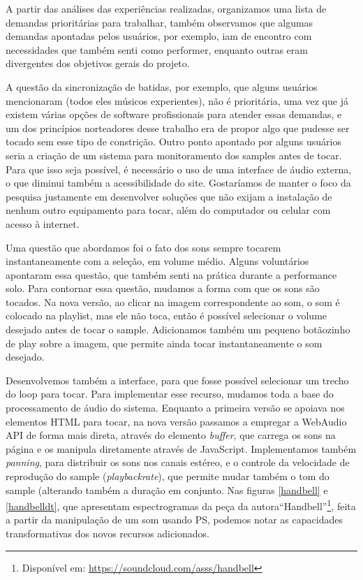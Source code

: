  A partir das análises das experiências realizadas, organizamos uma lista de demandas prioritárias para trabalhar, também observamos que algumas demandas apontadas pelos usuários, por exemplo, iam de encontro com necessidades que também senti como performer, enquanto outras eram divergentes dos objetivos gerais do projeto.

 A questão da sincronização de batidas, por exemplo, que alguns usuários mencionaram (todos eles músicos experientes), não é prioritária, uma vez que já existem várias opções de software profissionais para atender essas demandas, e um dos princípios norteadores desse trabalho era de propor algo que pudesse ser tocado sem esse tipo de constrição. Outro ponto apontado por alguns usuários seria a criação de um sistema para monitoramento dos samples antes de tocar. Para que isso seja possível, é necessário o uso de uma interface de áudio externa, o que diminui também a acessibilidade do site. Gostaríamos de manter o foco da pesquisa justamente em desenvolver soluções que não exijam a instalação de nenhum outro equipamento para tocar, além do computador ou celular com acesso à internet. 

 Uma questão que abordamos foi o fato dos sons sempre tocarem instantaneamente com a seleção, em volume médio. Alguns voluntários apontaram essa questão, que também senti na prática durante a performance solo. Para contornar essa questão, mudamos a forma com que os sons são tocados. Na nova versão, ao clicar na imagem correspondente ao som, o som é colocado na playlist, mas ele não toca, então é possível selecionar o volume desejado antes de tocar o sample. Adicionamos também um pequeno botãozinho de play sobre a imagem, que permite ainda tocar instantaneamente o som desejado.

 Desenvolvemos também a interface, para que fosse possível selecionar um trecho do loop para tocar. Para implementar esse recurso, mudamos toda a base do processamento de áudio do sistema. Enquanto a primeira versão se apoiava nos elementos HTML para tocar, na nova versão passamos a empregar a WebAudio API de forma mais direta, através do elemento \emph{buffer}, que carrega os sons na página e os manipula diretamente através de JavaScript. Implementamos também \emph{panning}, para distribuir os sons nos canais estéreo, e o controle da velocidade de reprodução do sample (\emph{playbackrate}), que permite mudar também o tom do sample (alterando também a duração em conjunto. Nas figuras \ref{handbell} e \ref{handbelldt}, que apresentam espectrogramas da peça da autora``Handbell''\footnote{Disponível em: \url{https://soundcloud.com/asss/handbell}}, feita a partir da manipulação de um som usando PS, podemos notar as capacidades transformativas dos novos recursos adicionados. 



